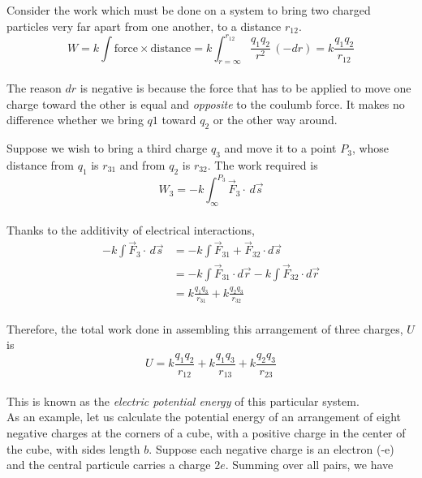 \documentclass[svgnames]{article}
\begin{document}
Consider the work which must be done on a system to bring two charged particles very far apart from one another, to a distance $r_{12}$. \\

\[ W = k \int \text{force} \times \text{distance} = k\int_{r = \infty}^{r_{12}} \frac{q_1q_2}{r^2}\,(-dr) = k\frac{q_1q_2}{r_{12}} \] \\

The reason $dr$ is negative is because the force that has to be applied to move one charge toward the other is equal and \textit{opposite} to the coulumb force. It makes no difference whether we bring $q1$ toward $q_2$ or the other way around. 

Suppose we wish to bring a third charge $q_3$ and move it to a point $P_3$, whose distance from $q_1$ is $r_{31}$ and from $q_2$ is $r_{32}$. The work required is \\

\[ W_3 = - k\int_\infty^{P_3} \vec{F}_3 \cdot \, d\vec{s}  \] \\

Thanks to the additivity of electrical interactions, \\ 
\begin{align*}
-k\int \vec{F}_3 \cdot \, d\vec{s} &= -k\int \vec{F}_{31} + \vec{F}_{32} \cdot d\vec{s} \\
&= -k\int \vec{F}_{31} \cdot d\vec{r} - k\int \vec{F}_{32} \cdot d\vec{r} \\ 
&= k\frac{q_1q_3}{r_{31}} + k\frac{q_2q_3}{r_{32}} 
\end{align*} \\ 

Therefore, the total work done in assembling this arrangement of three charges, $U$ is \\

\[ U = k\frac{q_1q_2}{r_{12}} + k\frac{q_1q_3}{r_{13}} +  k\frac{q_2q_3}{r_{23}} \] \\

This is known as the \textit{electric potential energy} of this particular system. \\

As an example, let us calculate the potential energy of an arrangement of eight negative charges at the corners of a cube, with a positive charge in the center of the cube, with sides length $b$. Suppose each negative charge is an electron (-e) and the central particule carries a charge $2e$. Summing over all pairs, we have \\ 
\end{document}

